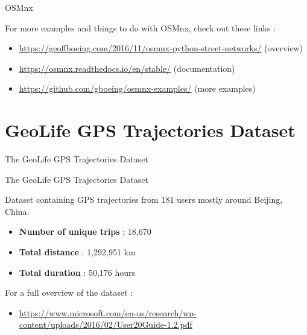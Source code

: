 \documentclass[aspectratio=169]{beamer}
\begin{document}
\begin{frame}{OSMnx \cite{boeing2017osmnx}}

{\Large For more examples and things to do with OSMnx, check out these links :}
\vspace{1cm}
\begin{itemize}
	\item \url{https://geoffboeing.com/2016/11/osmnx-python-street-networks/} (overview)
	\item \url{https://osmnx.readthedocs.io/en/stable/} (documentation)
	\item \url{https://github.com/gboeing/osmnx-examples/} (more examples)
\end{itemize}

\end{frame}


\section{GeoLife GPS Trajectories Dataset}

\begin{frame}{The GeoLife GPS Trajectories Dataset \cite{zheng2008understanding, zheng2010geolife, zheng2009mining}}

\begin{center}
{\LARGE The GeoLife GPS Trajectories Dataset}
\end{center}

Dataset containing GPS trajectories from 181 users mostly around Beijing, China.
\begin{itemize}
	\item \textbf{Number of unique trips} : 18,670
	\item \textbf{Total distance} : 1,292,951 km
	\item \textbf{Total duration} : 50,176 hours
\end{itemize}
\vspace{.5cm}
For a full overview of the dataset :
\begin{itemize}
	\item \url{https://www.microsoft.com/en-us/research/wp-content/uploads/2016/02/User20Guide-1.2.pdf}
\end{itemize}

\end{frame}
\end{document}
